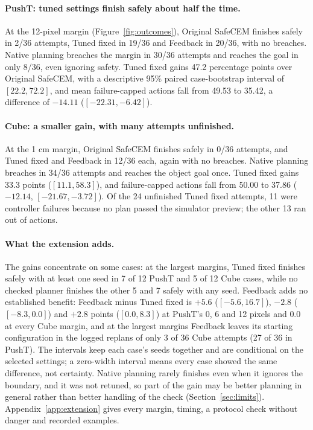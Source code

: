 \paragraph{PushT: tuned settings finish safely about half the time.}
At the 12-pixel margin (Figure~\ref{fig:outcomes}), Original SafeCEM
finishes safely in 2/36 attempts, Tuned fixed in 19/36 and Feedback in
20/36, with no breaches. Native planning breaches the margin in 30/36
attempts and reaches the goal in only 8/36, even ignoring safety. Tuned
fixed gains 47.2 percentage points over Original SafeCEM, with a descriptive
95\% paired case-bootstrap interval of $[22.2,72.2]$, and mean
failure-capped actions fall from 49.53 to 35.42, a difference of $-14.11$
($[-22.31,-6.42]$).

\paragraph{Cube: a smaller gain, with many attempts unfinished.}
At the 1 cm margin, Original SafeCEM finishes safely in 0/36 attempts, and
Tuned fixed and Feedback in 12/36 each, again with no breaches. Native
planning breaches in 34/36 attempts and reaches the object goal once. Tuned
fixed gains 33.3 points ($[11.1,58.3]$), and failure-capped actions fall
from 50.00 to 37.86 ($-12.14$, $[-21.67,-3.72]$). Of the 24 unfinished Tuned
fixed attempts, 11 were controller failures because no plan passed the
simulator preview; the other 13 ran out of actions.

\paragraph{What the extension adds.}
The gains concentrate on some cases: at the largest margins, Tuned fixed
finishes safely with at least one seed in 7 of 12 PushT and 5 of 12 Cube
cases, while no checked planner finishes the other 5 and 7 safely with any
seed. Feedback adds no established benefit: Feedback minus Tuned fixed is
$+5.6$ ($[-5.6,16.7]$), $-2.8$ ($[-8.3,0.0]$) and $+2.8$ points
($[0.0,8.3]$) at PushT's 0, 6 and 12 pixels and 0.0 at every Cube margin,
and at the largest margins Feedback leaves its starting configuration in
the logged replans of only 3 of 36 Cube attempts (27 of 36 in PushT). The
intervals keep each case's seeds together and are conditional on the
selected settings; a zero-width interval means every case showed the same
difference, not certainty. Native planning rarely finishes even when it
ignores the boundary, and it was not retuned, so part of the gain may be
better planning in general rather than better handling of the check
(Section~\ref{sec:limits}). Appendix~\ref{app:extension} gives every margin,
timing, a protocol check without danger and recorded examples.
